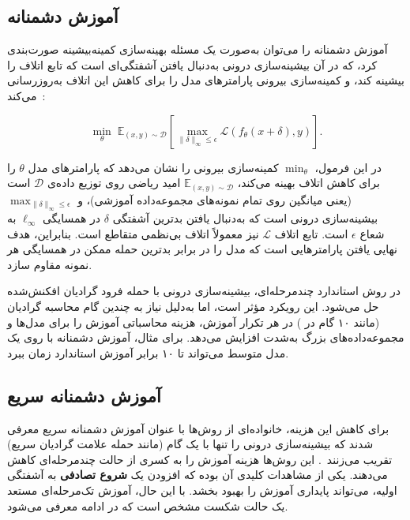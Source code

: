 \documentclass[11pt]{article}
\begin{document}
\subsection{آموزش دشمنانه}

آموزش دشمنانه را می‌توان به‌صورت یک مسئله‌ بهینه‌سازی کمینه‌بیشینه صورت‌بندی کرد،
که در آن بیشینه‌سازی درونی به‌دنبال یافتن آشفتگی‌ای است که تابع اتلاف را بیشینه کند،
و کمینه‌سازی بیرونی پارامترهای مدل را برای کاهش این اتلاف به‌روزرسانی می‌کند~\cite{madry2018towards}:

\begin{equation}
\min_{\theta} \; \mathbb{E}_{(x,y)\sim\mathcal{D}} \left[ \max_{\|\delta\|_{\infty}\le\epsilon} \mathcal{L}(f_{\theta}(x+\delta), y) \right].
\end{equation}

در این فرمول، $\min_{\theta}$ کمینه‌سازی بیرونی را نشان می‌دهد که پارامترهای مدل $\theta$ را برای کاهش اتلاف بهینه می‌کند،
$\mathbb{E}_{(x,y)\sim\mathcal{D}}$ امید ریاضی روی توزیع داده‌ی $\mathcal{D}$ است
(یعنی میانگین روی تمام نمونه‌های مجموعه‌داده‌ آموزشی)،
و $\max_{\|\delta\|_{\infty}\le\epsilon}$ بیشینه‌سازی درونی است
که به‌دنبال یافتن بدترین آشفتگی $\delta$ در همسایگی $\ell_{\infty}$ به شعاع $\epsilon$ است.
تابع اتلاف $\mathcal{L}$ نیز معمولاً اتلاف بی‌نظمی متقاطع است.
بنابراین، هدف نهایی یافتن پارامترهایی است که مدل را در برابر بدترین حمله‌ ممکن در همسایگی هر نمونه مقاوم سازد.

در روش استاندارد چندمرحله‌ای، بیشینه‌سازی درونی با حمله‌ فرود گرادیان افکنش‌شده حل می‌شود.
این رویکرد مؤثر است، اما به‌دلیل نیاز به چندین گام محاسبه‌ گرادیان (مانند ۱۰ گام در ) در هر تکرار آموزش،
هزینه‌ محاسباتی آموزش را برای مدل‌ها و مجموعه‌داده‌های بزرگ به‌شدت افزایش می‌دهد.
برای مثال، آموزش دشمنانه با  روی یک مدل متوسط می‌تواند تا ۱۰ برابر آموزش استاندارد زمان ببرد.

\subsection{آموزش دشمنانه سریع}

برای کاهش این هزینه، خانواده‌ای از روش‌ها با عنوان آموزش دشمنانه سریع معرفی شدند
که بیشینه‌سازی درونی را تنها با یک گام (مانند حمله‌ علامت گرادیان سریع) تقریب می‌زنند~\cite{wong2020fast}.
این روش‌ها هزینه‌ آموزش را به کسری از حالت چندمرحله‌ای کاهش می‌دهند.
یکی از مشاهدات کلیدی آن بوده که افزودن یک \textbf{شروع تصادفی} به آشفتگی اولیه،
می‌تواند پایداری آموزش را بهبود بخشد.
با این حال، آموزش تک‌مرحله‌ای مستعد یک حالت شکست مشخص است که در ادامه معرفی می‌شود.
\end{document}
